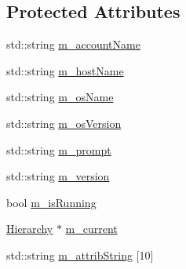 \subsection*{Protected Attributes}
\begin{DoxyCompactItemize}
\item 
std\+::string \hyperlink{classApplication_ac6ecd97be07092147986a7a5965c54ec}{m\+\_\+account\+Name}
\item 
std\+::string \hyperlink{classApplication_a20094c2bf311e2046942eeeec4a11f02}{m\+\_\+host\+Name}
\item 
std\+::string \hyperlink{classApplication_a59f90c6ff4ee3db646ca656c71cc77e7}{m\+\_\+os\+Name}
\item 
std\+::string \hyperlink{classApplication_a17949f767d2598e92acb0885bb399dc0}{m\+\_\+os\+Version}
\item 
std\+::string \hyperlink{classApplication_a84f3f07f42ad77ad46cc8ef42d609948}{m\+\_\+prompt}
\item 
std\+::string \hyperlink{classApplication_acbbdbd17a3a66782c54dbbe58a9ca8d8}{m\+\_\+version}
\item 
bool \hyperlink{classApplication_ae316ea43e74cc0d536dcbb16b2fbb974}{m\+\_\+is\+Running}
\item 
\hyperlink{classHierarchy}{Hierarchy} $\ast$ \hyperlink{classApplication_ab0fd877a3c66c41b22109863e1719ccd}{m\+\_\+current}
\item 
std\+::string \hyperlink{classAttrib_a3414521d7a82476e874b25a5407b5e63}{m\+\_\+attrib\+String} \mbox{[}10\mbox{]}
\end{DoxyCompactItemize}
